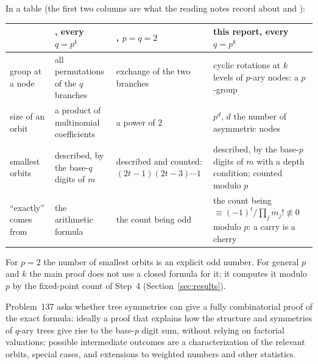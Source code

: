 \documentclass[11pt]{article}
\theoremstyle{definition}
\theoremstyle{remark}
\numberwithin{equation}{section}
\numberwithin{figure}{section}
\begin{document}
In a table (the first two columns are what the reading notes record about \cite{Konvalinka} and
\cite{DeutschSagan}):
\begin{center}\small
\begin{tabular}{@{}>{\raggedright\arraybackslash}p{}>{\raggedright\arraybackslash}p{}>{\raggedright\arraybackslash}p{}>{\raggedright\arraybackslash}p{}@{}}
\toprule
 & \cite{Konvalinka}, every $q=p^k$ & \cite{DeutschSagan}, $p=q=2$ & this report, every $q=p^k$\\
\midrule
group at a node & all permutations of the $q$ branches & exchange of the two branches
 & cyclic rotations at $k$ levels of $p$-ary nodes: a $p$-group\\
size of an orbit & a product of multinomial coefficients & a power of $2$
 & $p^{d}$, $d$ the number of asymmetric nodes\\
smallest orbits & described, by the base-$q$ digits of $m$ & described and counted: $(2t-1)(2t-3)\cdots1$
 & described, by the base-$p$ digits of $m$ with a depth condition; counted modulo $p$\\
``exactly'' comes from & the arithmetic formula & the count being odd
 & the count being $\equiv(-1)^t/\prod_jm_j!\not\equiv0$ modulo $p$: a carry is a cherry\\
\bottomrule
\end{tabular}
\end{center}
For $p=2$ the number of smallest orbits is an explicit odd number. For general $p$ and $k$ the main proof
does not use a closed formula for it; it computes it modulo $p$ by the fixed-point count of Step~4
(Section~\ref{sec:results}).

Problem~137 asks whether tree symmetries can give a fully combinatorial proof of the exact formula: ideally a
proof that explains how the structure and symmetries of $q$-ary trees give rise to the base-$p$ digit sum,
without relying on factorial valuations; possible intermediate outcomes are a characterization of the relevant
orbits, special cases, and extensions to weighted numbers and other statistics.
\end{document}
